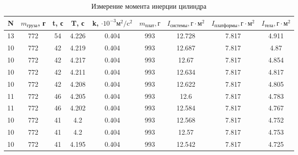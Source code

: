 \documentclass[a4paper,12pt]{article} %
\begin{document}
\begin{table} \label{Цилиндр} \caption{Измерение момента инерции цилиндра} \begin{tabular}{|c|c|c|c|c|c|c|c|c|} \hline N & $m_\text{груза}$, г & t, с & T, с & k, $\cdot 10^{-3}\text{м}^2/\text{c}^2$ & $m_\text{плат}, г$ & $I_\text{системы}, \text{г}\cdot \text{м}^2$ &$I_\text{платформы}, \text{г}\cdot \text{м}^2$ & $I_\text{тела}, \text{г}\cdot \text{м}^2$ \\ \hline 13 & 772 & 54 & 4.226 & 0.404 & 993 & 12.728 & 7.817 & 4.911 \\ \hline 10 & 772 & 42 & 4.219 & 0.404 & 993 & 12.687 & 7.817 & 4.87 \\ \hline 10 & 772 & 42 & 4.217 & 0.404 & 993 & 12.67 & 7.817 & 4.854 \\ \hline 10 & 772 & 42 & 4.211 & 0.404 & 993 & 12.634 & 7.817 & 4.817 \\ \hline 10 & 772 & 42 & 4.208 & 0.404 & 993 & 12.622 & 7.817 & 4.805 \\ \hline 11 & 772 & 46 & 4.205 & 0.404 & 993 & 12.6 & 7.817 & 4.783 \\ \hline 11 & 772 & 46 & 4.202 & 0.404 & 993 & 12.584 & 7.817 & 4.767 \\ \hline 10 & 772 & 41 & 4.2 & 0.404 & 993 & 12.568 & 7.817 & 4.752 \\ \hline 10 & 772 & 41 & 4.2 & 0.404 & 993 & 12.57 & 7.817 & 4.753 \\ \hline 10 & 772 & 41 & 4.195 & 0.404 & 993 & 12.542 & 7.817 & 4.725 \\ \hline \end{tabular} \end{table}
\end{document}
